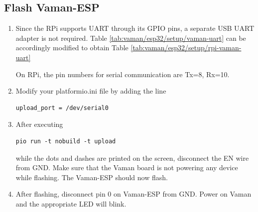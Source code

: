 \documentclass[journal,12pt,twocolumn]{IEEEtran}
\renewcommand\thesection{\arabic{section}}
\renewcommand\thesubsection{\thesection.\arabic{subsection}}
\begin{document}
\subsection{Flash Vaman-ESP}
\renewcommand{\theequation}{\theenumi}
\renewcommand{\thefigure}{\theenumi}
\begin{enumerate}[label=\thesubsection.\arabic*.,ref=\thesubsection.\theenumi]
\item Since the RPi supports UART through its GPIO pins, a separate USB UART adapter is not required.  Table 
		\ref{tab:vaman/esp32/setup/vaman-uart} can be accordingly modified to obtain Table 
		\ref{tab:vaman/esp32/setup/rpi-vaman-uart}
			\begin{table}[!h]
		
		\caption{}
		\label{tab:vaman/esp32/setup/rpi-vaman-uart}
	\end{table}
	On RPi, the pin numbers for serial communication are Tx=8, Rx=10.
\item Modify your platformio.ini file by adding the line 
\begin{lstlisting}
upload_port = /dev/serial0
\end{lstlisting}

\item After executing 
\begin{lstlisting}
pio run -t nobuild -t upload
\end{lstlisting}
while the dots and dashes are printed on the screen, disconnect the EN wire from GND.   Make sure that the Vaman board is not powering any device while flashing.  The Vaman-ESP should now flash.
\item After flashing, disconnect pin 0 on Vaman-ESP from GND. Power on Vaman and the appropriate LED will blink.
\end{enumerate}
\end{document}
